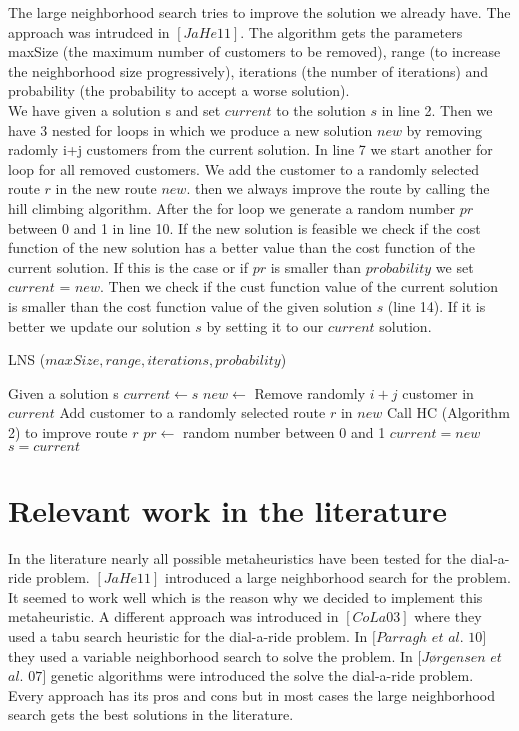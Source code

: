 \documentclass[fleqn]{scrartcl}
\begin{document}
The large neighborhood search tries to improve the solution we already have. The approach was intrudced in $[JaHe 11]$. The algorithm gets the parameters maxSize (the maximum number of customers to be removed), range (to increase the neighborhood size progressively), iterations (the number of iterations) and probability (the probability to accept a worse solution). \\
We have given a solution s and set $current$ to the solution $s$ in line 2. Then we have 3 nested for loops in which we produce a new solution $new$ by removing radomly i+j customers from the current solution. In line 7 we start another for loop for all removed customers. We add the customer to a randomly selected route $r$ in the new route $new$. then we always improve the route by calling the hill climbing algorithm. After the for loop we generate a random number $pr$ between 0 and 1 in line 10. If the new solution is feasible we check if the cost function of the new solution has a better value than the cost function of the current solution. If this is the case or if $pr$ is smaller than $probability$ we set $current$ = $new$. Then we check if the cust function value of the current solution is smaller than the cost function value of the given solution $s$ (line 14). If it is better we update our solution $s$ by setting it to our $current$ solution.
 
\begin{algorithm}
\caption{LNS ($maxSize, range, iterations, probability$)}\label{lns}
\begin{algorithmic}[1]
\State Given a solution s
\State $current \gets s$
\State $new \gets$ Remove randomly $i+j$ customer in $current$
\State Add customer to a randomly selected route $r$ in $new$
\State Call HC (Algorithm 2) to improve route $r$
\EndFor
\State $pr \gets$ random number between 0 and 1
\State $current = new$
\State $s = current$
\EndIf
\EndIf
\EndIf
\EndFor
\EndFor
\EndFor
\end{algorithmic}
\end{algorithm}
\newpage
\section{Relevant work in the literature}
In the literature nearly all possible metaheuristics have been tested for the dial-a-ride problem. 
$[JaHe 11]$ introduced a large neighborhood search for the problem. It seemed to work well which is the reason why we decided to implement this metaheuristic. A different approach was introduced in $[CoLa 03]$ where they used a tabu search heuristic for the dial-a-ride problem. In $[Parragh$  $et$  $al.$ $10]$ they used a variable neighborhood search to solve the problem. In $[Jørgensen$ $et$ $al.$ $07]$ genetic algorithms were introduced the solve the dial-a-ride problem.
Every approach has its pros and cons but in most cases the large neighborhood search gets the best solutions in the literature.
\newpage
\end{document}

